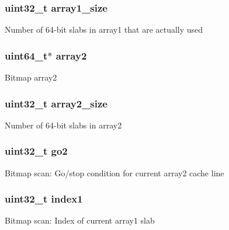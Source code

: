 \subsubsection[{array1\+\_\+size}]{\setlength{\rightskip}{0pt plus 5cm}uint32\+\_\+t array1\+\_\+size}\label{structrte__bitmap_a280151fd5ef07a0ba67e352d340658a0}
Number of 64-\/bit slabs in array1 that are actually used \hypertarget{structrte__bitmap_a7025f580cb18e7066ae946128df40929}{}
\subsubsection[{array2}]{\setlength{\rightskip}{0pt plus 5cm}uint64\+\_\+t$\ast$ array2}\label{structrte__bitmap_a7025f580cb18e7066ae946128df40929}
Bitmap array2 \hypertarget{structrte__bitmap_a0c8e04ff3e358b360017573acc3c8ba5}{}
\subsubsection[{array2\+\_\+size}]{\setlength{\rightskip}{0pt plus 5cm}uint32\+\_\+t array2\+\_\+size}\label{structrte__bitmap_a0c8e04ff3e358b360017573acc3c8ba5}
Number of 64-\/bit slabs in array2 \hypertarget{structrte__bitmap_a6df8695cbbb48813a048f9616433416a}{}
\subsubsection[{go2}]{\setlength{\rightskip}{0pt plus 5cm}uint32\+\_\+t go2}\label{structrte__bitmap_a6df8695cbbb48813a048f9616433416a}
Bitmap scan\+: Go/stop condition for current array2 cache line \hypertarget{structrte__bitmap_a6db57dc734285937f76eb3b193d4e58e}{}
\subsubsection[{index1}]{\setlength{\rightskip}{0pt plus 5cm}uint32\+\_\+t index1}\label{structrte__bitmap_a6db57dc734285937f76eb3b193d4e58e}
Bitmap scan\+: Index of current array1 slab \hypertarget{structrte__bitmap_a1448310cceb53513c1955213ed3918b3}{}
